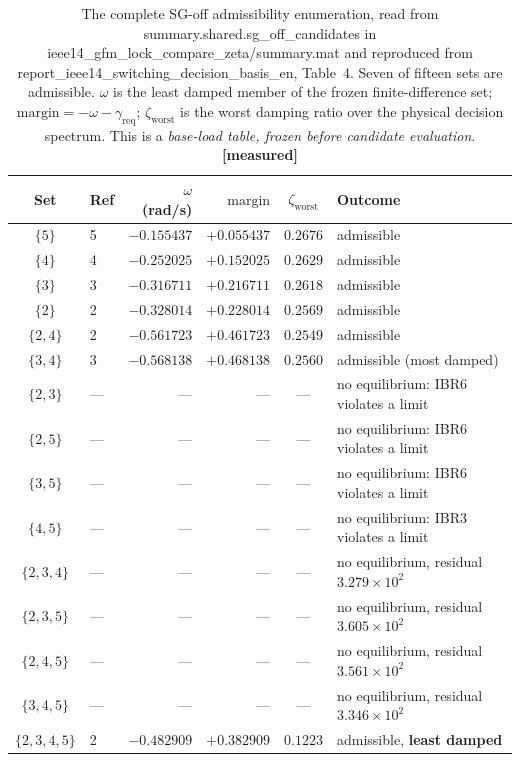 \documentclass[12pt,a4paper]{article}
\theoremstyle{remark}
\newcommand{\zworst}{\zeta_{\mathrm{worst}}}
\newcommand{\greq}{\gamma_{\mathrm{req}}}
\newcommand{\code}[1]{{\ttfamily\small\hyphenchar\font=-1 #1}}
\newcommand{\measured}{\textcolor{ok}{\textbf{[measured]}}}
\begin{document}
\begin{table}[H]
\centering
\small
\begin{tabular}{@{}clrrcl@{}}
\toprule
\textbf{Set} & \textbf{Ref} & $\omega$ (rad/s) & $\mathrm{margin}$ & $\zworst$ & \textbf{Outcome}\\
\midrule
$\{5\}$        & 5 & $-0.155437$ & $+0.055437$ & $0.2676$ & admissible\\
$\{4\}$        & 4 & $-0.252025$ & $+0.152025$ & $0.2629$ & admissible\\
$\{3\}$        & 3 & $-0.316711$ & $+0.216711$ & $0.2618$ & admissible\\
$\{2\}$        & 2 & $-0.328014$ & $+0.228014$ & $0.2569$ & admissible\\
$\{2,4\}$      & 2 & $-0.561723$ & $+0.461723$ & $0.2549$ & admissible\\
$\{3,4\}$      & 3 & $\mathbf{-0.568138}$ & $\mathbf{+0.468138}$ & $0.2560$ & admissible (most damped)\\
\midrule
$\{2,3\}$      & --- & --- & --- & --- & no equilibrium: IBR6 violates a limit\\
$\{2,5\}$      & --- & --- & --- & --- & no equilibrium: IBR6 violates a limit\\
$\{3,5\}$      & --- & --- & --- & --- & no equilibrium: IBR6 violates a limit\\
$\{4,5\}$      & --- & --- & --- & --- & no equilibrium: IBR3 violates a limit\\
\midrule
$\{2,3,4\}$    & --- & --- & --- & --- & no equilibrium, residual $3.279\times10^{2}$\\
$\{2,3,5\}$    & --- & --- & --- & --- & no equilibrium, residual $3.605\times10^{2}$\\
$\{2,4,5\}$    & --- & --- & --- & --- & no equilibrium, residual $3.561\times10^{2}$\\
$\{3,4,5\}$    & --- & --- & --- & --- & no equilibrium, residual $3.346\times10^{2}$\\
\midrule
$\{2,3,4,5\}$  & 2 & $-0.482909$ & $+0.382909$ & $\mathbf{0.1223}$ & admissible, \textcolor{no}{\textbf{least damped}}\\
\bottomrule
\end{tabular}
\caption{The complete SG-off admissibility enumeration, read from
\code{summary.shared.sg\_off\_candidates} in
\code{ieee14\_gfm\_lock\_compare\_zeta/summary.mat} and reproduced from
\code{report\_ieee14\_switching\_decision\_basis\_en}, Table~4. Seven of fifteen
sets are admissible. $\omega$ is the least damped member of the frozen
finite-difference set; $\mathrm{margin} = -\omega - \greq$; $\zworst$ is the
worst damping ratio over the physical decision spectrum. This is a
\emph{base-load table, frozen before candidate evaluation}. \measured}
\label{tab:adm}
\end{table}
\end{document}
